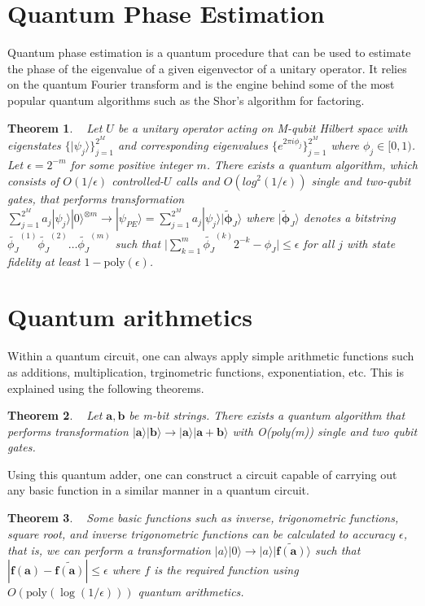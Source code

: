 \documentclass[a4paper,twocolumn,11pt,unpublished]{quantumarticle}
\newcommand{\rang}{\rangle}
\newtheorem{theorem}{Theorem}
\begin{document}
\section{Quantum Phase Estimation} \label{app:qpe}

    Quantum phase estimation is a quantum procedure that can be used to estimate the phase of the eigenvalue of a given eigenvector of a unitary operator. It relies on the quantum Fourier transform and is the engine behind some of the most popular quantum algorithms such as the Shor's algorithm for factoring.
    \begin{theorem}
        ~\cite{Cleve1998} Let $U$ be a unitary operator acting on M-qubit Hilbert space with eigenstates $\{ |\psi_j \rang \}_{j = 1} ^ {2 ^ M}$ and corresponding eigenvalues $\{ e ^ {2 \pi i \phi_j}\}_{j = 1} ^ {2 ^ M}$ where $\phi_j \in [0, 1)$. Let $\epsilon = 2 ^ {-m}$ for some positive integer $m$. There exists a quantum algorithm, which consists of $O(1/ \epsilon)$ controlled-$U$ calls and $O(log^2(1/ \epsilon))$ single and two-qubit gates, that performs transformation $\sum \limits_{j = 1} ^ {2 ^ M} a_j |\psi_j \rang |0 \rang ^ {\otimes m} \rightarrow | \psi_{PE} \rang = \sum \limits_{j = 1} ^ {2 ^ M} a_j |\psi_j \rang | \tilde{\mathbf{\phi}}_J \rang$ where $| \tilde{\mathbf{\phi}}_J \rang$ denotes a bitstring $\tilde{\phi_J} ^ {(1)} \tilde{\phi_J} ^ {(2)} \dots \tilde{\phi_J} ^ {(m)}$ such that $\Big| \sum \limits_{k = 1} ^ {m} \tilde{\phi_J} ^ {(k)} 2 ^ {-k} - \phi_J \Big| \leq \epsilon$ for all $j$ with state fidelity at least $1 - \text{poly}(\epsilon)$.
    \end{theorem}
\section{Quantum arithmetics} \label{qa}
    Within a quantum circuit, one can always apply simple arithmetic functions such as additions, multiplication, trginometric functions, exponentiation, etc. This is explained using the following theorems.
    \begin{theorem}
        ~\cite{Perez2017} Let $\mathbf{a}, \mathbf{b}$ be m-bit strings. There exists a quantum algorithm that performs transformation $|\mathbf{a} \rangle |\mathbf{b} \rangle \rightarrow |\mathbf{a} \rangle |\mathbf{a + b} \rangle$ with \textit{O}(poly(m)) single and two qubit gates.
    \end{theorem}
    Using this quantum adder, one can construct a circuit capable of carrying out any basic function in a similar manner in a quantum circuit.
    \begin{theorem}
        ~\cite{Mitarai2019} Some basic functions such as inverse, trigonometric functions, square root, and inverse trigonometric functions can be calculated to accuracy $\epsilon$, that is, we can perform a transformation $|a\rangle |0\rangle \rightarrow |a\rangle |\tilde{\mathbf{f(a)}}\rangle$ such that $|\mathbf{f(a)} - \tilde{\mathbf{f(a)}}| \leq \epsilon$ where $f$ is the required function using ${O}(\text{poly}(\log(1/\epsilon)))$ quantum arithmetics.
    \end{theorem} 
\end{document}

